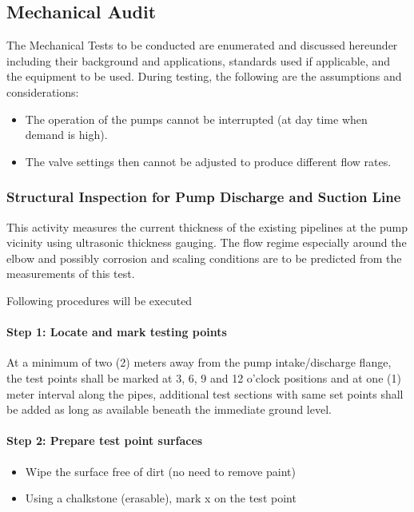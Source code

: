 \subsection{Mechanical Audit}
\label{232}
The Mechanical Tests to be conducted are enumerated and discussed hereunder including their background and applications, standards used if applicable, and the equipment to be used. During testing, the following are the assumptions and considerations:

\begin{itemize}
\item The operation of the pumps cannot be interrupted (at day time when demand is high).
\item The valve settings then cannot be adjusted to produce different flow rates.
\end{itemize}

\subsubsection{Structural Inspection for Pump Discharge and Suction Line}

This activity measures the current thickness of the existing pipelines at the pump vicinity using ultrasonic thickness gauging. The flow regime especially around the elbow and possibly corrosion and scaling conditions are to be predicted from the measurements of this test.

Following procedures will be executed

\paragraph{Step 1: Locate and mark testing points}
At a minimum of two (2) meters away from the pump intake/discharge flange, the test points shall be marked at 3, 6, 9 and 12 o’clock positions and at one (1) meter interval along the pipes, additional test sections with same set points shall be added as long as available beneath the immediate ground level.



\paragraph{Step 2: Prepare test point surfaces}
\begin{itemize}
\item	Wipe the surface free of dirt (no need to remove paint)
\item	Using a chalkstone (erasable), mark x on the test point
\end{itemize}

